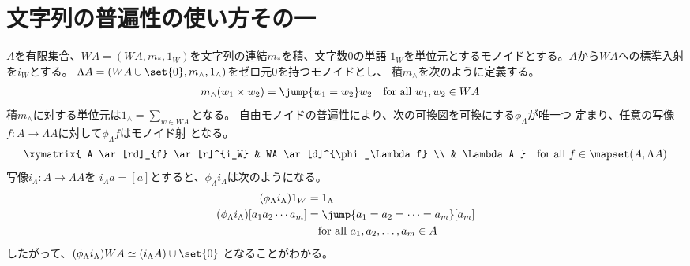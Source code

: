 \section{文字列の普遍性の使い方その一}\label{s1:文字列の普遍性の使い方その一} %
	$A$を有限集合、$WA=(WA,m_*,1_W)$を文字列の連結$m_*$を積、文字数0の単語
	$1_W$を単位元とするモノイドとする。$A$から$WA$への標準入射を$i_W$とする。
	$\Lambda A=(WA\cup\set{0},m_\land,1_\land)$をゼロ元$0$を持つモノイドとし、
	積$m_\land$を次のように定義する。
	\begin{equation*}\begin{split} %
		m_\land(w_1\times w_2) &= \jump{w_1=w_2}w_2
		\quad\text{for all }w_1,w_2\in WA
	\end{split}\end{equation*} %
	積$m_\land$に対する単位元は$1_\land=\sum_{w\in WA}$となる。
	自由モノイドの普遍性により、次の可換図を可換にする$\phi_\Lambda$が唯一つ
	定まり、任意の写像$f:A\to\Lambda A$に対して$\phi_\Lambda f$はモノイド射
	となる。
	\begin{equation*}
		\xymatrix{
			A \ar[rd]_{f} \ar[r]^{i_W} & WA \ar[d]^{\phi_\Lambda f} \\
			& \Lambda A
		}\quad\text{for all }f\in \mapset(A,\Lambda A) \\
	\end{equation*}
	写像$i_\Lambda:A\to \Lambda A$を
	$i_\Lambda a=[a]$とすると、$\phi_\Lambda i_\Lambda$は次のようになる。
	\begin{equation*}\begin{split} %
		(\phi_\Lambda i_\Lambda)1_W &= 1_\Lambda \\
		(\phi_\Lambda i_\Lambda)[a_1a_2\cdots a_m] 
		&= \jump{a_1=a_2=\cdots=a_m}[a_m] \\
		&\quad\text{for all }a_1,a_2,\dots,a_m\in A \\
	\end{split}\end{equation*} %
	したがって、$(\phi_\Lambda i_\Lambda)WA\simeq(i_\Lambda A)\cup\set{0}$
	となることがわかる。

